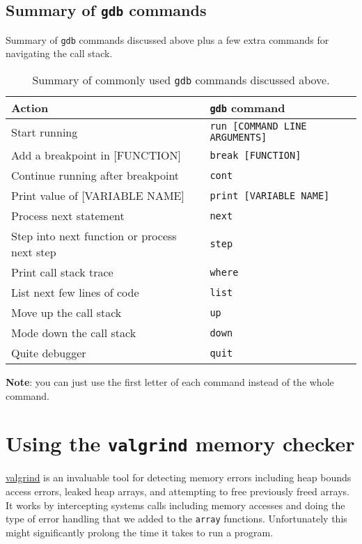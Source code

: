 \subsection{Summary of \texttt{gdb} commands}

Summary of \texttt{gdb} commands discussed above plus a few extra commands for navigating the call stack.
\begin{table}[htbp!]
    \centering
    \begin{tabular}{l|l} \hline
      Action &\texttt{gdb} command\\ \hline
         Start running &  \texttt{run [COMMAND LINE ARGUMENTS]}\\ 
         Add a breakpoint in [FUNCTION] &  \texttt{break [FUNCTION]}\\
         Continue running after breakpoint &  \texttt{cont}\\
         Print value of [VARIABLE NAME] & \texttt{print [VARIABLE NAME]} \\
         Process next statement & \texttt{next} \\
         Step into next function or process next step & \texttt{step} \\
         Print call stack trace & \texttt{where} \\
         List next few lines of code & \texttt{list} \\
         Move up the call stack & \texttt{up} \\
         Mode down the call stack & \texttt{down} \\
         Quite debugger & \texttt{quit} \\
    \hline\end{tabular}
    \caption{Summary of commonly used \texttt{gdb} commands discussed above.}
    \label{terminalCommands.tab}
\end{table}

{\bf Note}: you can just use the first letter of each command instead of the whole command.

\section{Using the \texttt{valgrind} memory checker}

\href{http://valgrind.org}{valgrind} is an invaluable tool for detecting memory errors including heap bounds access errors, leaked heap arrays, and attempting to free previously freed arrays. It works by intercepting systems calls including memory accesses and doing the type of error handling that we added to the \texttt{array} functions. Unfortunately this might significantly prolong the time it takes to run a program.

